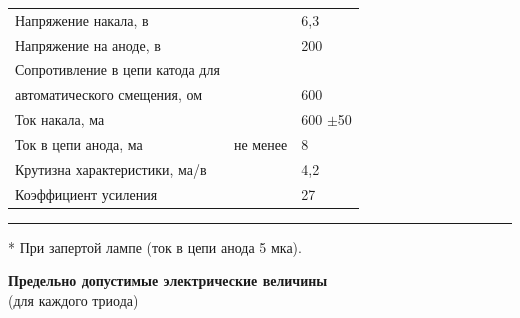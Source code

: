 \documentclass[12pt]{article}
\makeatletter
\renewcommand \dotfill {\leavevmode \cleaders \hb@xt@ 5mm{\hss .\hss }\hfill \kern \z@}
\makeatother
\begin{document}
    \begin{tabular}{p{105mm}l@{}l}
        Напряжение накала, в \hspace{0.1mm} \dotfill & & 6,3 \\
        Напряжение на аноде, в \hspace{-3.1mm} \dotfill & & 200 \\
        Сопротивление в цепи катода для \\
        \hspace{5mm} автоматического смещения, ом \hspace{-2.4mm} \dotfill & & 600 \\
        Ток накала, ма \hspace{-1mm} \dotfill & & 600 $\pm$50 \\
        Ток в цепи анода, ма \hspace{-2.2mm} \dotfill & \hspace{-7mm} не менее \hspace{1mm} & 8 \\
        Крутизна характеристики, ма/в \hspace{-3.4mm} \dotfill & & 4,2 \\
        Коэффициент усиления \hspace{-2.4mm} \dotfill & & 27 \\
    \end{tabular}
    
    \vspace{1mm}
    \hspace{-7mm} \rule{25mm}{0.5mm}
    
    * При запертой лампе (ток в цепи анода 5 мка).
    
    \newpage
    
    \noindent \textbf{Предельно допустимые электрические величины} \\
    (для каждого триода)
    
    \vspace{3mm}
    
\end{document}
